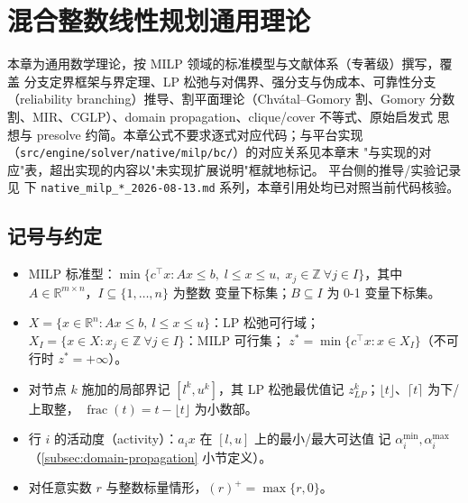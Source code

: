 
\section{混合整数线性规划通用理论}

\begin{theorynote}
本章为通用数学理论，按 MILP 领域的标准模型与文献体系（专著级）撰写，覆盖
分支定界框架与界定理、LP 松弛与对偶界、强分支与伪成本、可靠性分支
（reliability branching）推导、割平面理论（Chv\'atal--Gomory 割、Gomory
分数割、MIR、CGLP）、domain propagation、clique/cover 不等式、原始启发式
思想与 presolve 约简。本章公式不要求逐式对应代码；与平台实现
（\texttt{src/engine/solver/native/milp/bc/}）的对应关系见本章末
"与实现的对应"表，超出实现的内容以"未实现扩展说明"框就地标记。
平台侧的推导/实验记录见  下
\texttt{native\_milp\_*\_2026-08-13.md} 系列，本章引用处均已对照当前代码核验。
\end{theorynote}

\subsection{记号与约定}

\begin{itemize}
  \item MILP 标准型：$\min\{c^\top x : Ax \le b,\; l \le x \le u,\;
        x_j \in \mathbb{Z}\ \forall j \in I\}$，其中
        $A \in \mathbb{R}^{m \times n}$，$I \subseteq \{1,\ldots,n\}$ 为整数
        变量下标集；$B \subseteq I$ 为 0-1 变量下标集。
  \item $X = \{x \in \mathbb{R}^n : Ax \le b,\ l \le x \le u\}$：LP 松弛可行域；
        $X_I = \{x \in X : x_j \in \mathbb{Z}\ \forall j \in I\}$：MILP 可行集；
        $z^* = \min\{c^\top x : x \in X_I\}$（不可行时 $z^* = +\infty$）。
  \item 对节点 $k$ 施加的局部界记 $[l^k, u^k]$，其 LP 松弛最优值记
        $z_{LP}^k$；$\lfloor t \rfloor$、$\lceil t \rceil$ 为下/上取整，
        $\operatorname{frac}(t) = t - \lfloor t \rfloor$ 为小数部。
  \item 行 $i$ 的活动度（activity）：$a_i x$ 在 $[l,u]$ 上的最小/最大可达值
        记 $\alpha_i^{\min}, \alpha_i^{\max}$（\ref{subsec:domain-propagation} 小节定义）。
  \item 对任意实数 $r$ 与整数标量情形，$(r)^+ = \max\{r, 0\}$。
\end{itemize}

